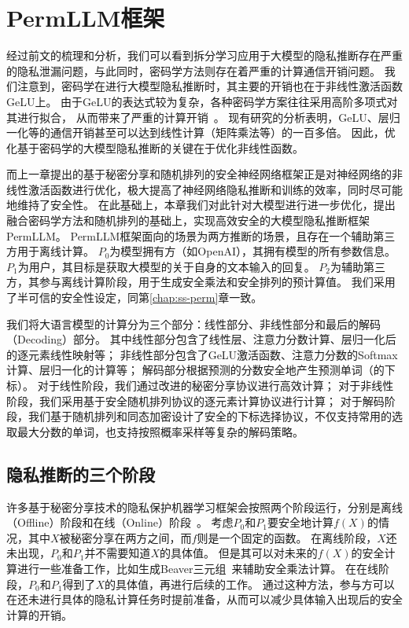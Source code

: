 \section{PermLLM框架}
经过前文的梳理和分析，我们可以看到拆分学习应用于大模型的隐私推断存在严重的隐私泄漏问题，与此同时，密码学方法则存在着严重的计算通信开销问题。
%
我们注意到，密码学在进行大模型隐私推断时，其主要的开销也在于非线性激活函数GeLU上。
由于GeLU的表达式较为复杂，各种密码学方案往往采用高阶多项式对其进行拟合，
从而带来了严重的计算开销~\cite{hou2023ciphergpt,lu2023bumblebee,dong2023puma,pang_2024_bolt_transformer}。
%
现有研究的分析表明，GeLU、层归一化等的通信开销甚至可以达到线性计算（矩阵乘法等）的一百多倍。
%
因此，优化基于密码学的大模型隐私推断的关键在于优化非线性函数。
%
%

而上一章提出的基于秘密分享和随机排列的安全神经网络框架正是对神经网络的非线性激活函数进行优化，极大提高了神经网络隐私推断和训练的效率，同时尽可能地维持了安全性。
%
在此基础上，本章我们对此针对大模型进行进一步优化，提出融合密码学方法和随机排列的基础上，实现高效安全的大模型隐私推断框架PermLLM。
%
PermLLM框架面向的场景为两方推断的场景，且存在一个辅助第三方用于离线计算。
%
$P_0$为模型拥有方（如OpenAI），其拥有模型的所有参数信息。
%
$P_1$为用户，其目标是获取大模型的关于自身的文本输入的回复。
%
$P_2$为辅助第三方，其参与离线计算阶段，用于生成安全乘法和安全排列的预计算值。
%
我们采用了半可信的安全性设定，同第\ref{chap:ss-perm}章一致。


我们将大语言模型的计算分为三个部分：线性部分、非线性部分和最后的解码（Decoding）部分。
其中线性部分包含了线性层、注意力分数计算、层归一化后的逐元素线性映射等；
非线性部分包含了GeLU激活函数、注意力分数的Softmax计算、层归一化的计算等；
解码部分根据预测的分数安全地产生预测单词（的下标）。
%
对于线性阶段，我们通过改进的秘密分享协议进行高效计算；
对于非线性阶段，我们采用基于安全随机排列协议的逐元素计算协议进行计算；
对于解码阶段，我们基于随机排列和同态加密设计了安全的下标选择协议，不仅支持常用的选取最大分数的单词，也支持按照概率采样等复杂的解码策略。
%


\subsection{隐私推断的三个阶段}
许多基于秘密分享技术的隐私保护机器学习框架会按照两个阶段运行，分别是离线（Offline）阶段和在线（Online）阶段~\cite{mohassel2017secureml,riazi_2018_chameleon}。
%
考虑$P_0$和$P_1$要安全地计算$f(X)$的情况，其中$X$被秘密分享在两方之间，而$f$则是一个固定的函数。
%
在离线阶段，$X$还未出现，$P_0$和$P_1$并不需要知道$X$的具体值。
%
但是其可以对未来的$f(X)$的安全计算进行一些准备工作，比如生成Beaver三元组~\cite{beaver1992efficient}来辅助安全乘法计算。
%
在在线阶段，$P_0$和$P_1$得到了$X$的具体值，再进行后续的工作。
通过这种方法，参与方可以在还未进行具体的隐私计算任务时提前准备，从而可以减少具体输入出现后的安全计算的开销。

